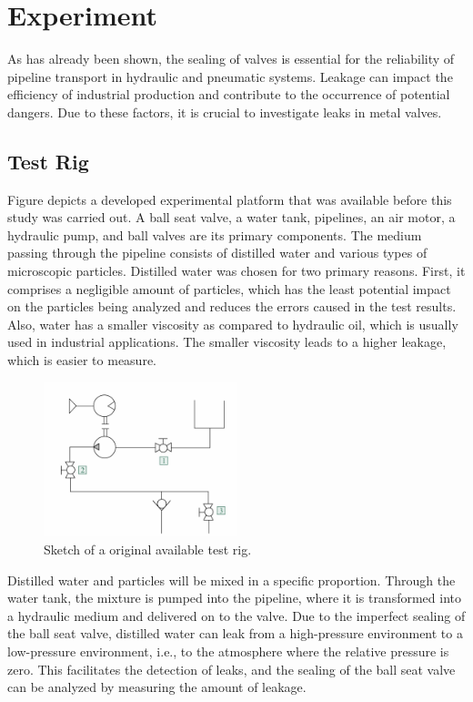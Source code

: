 \chapter{Experiment}
\label{ch:Experiment}
As has already been shown, the sealing of valves is essential for the reliability of 
pipeline transport in hydraulic and pneumatic systems. Leakage can impact the efficiency
 of industrial production and contribute to the occurrence of potential dangers. 
Due to these factors, it is crucial to investigate leaks in metal valves.\\

\section{Test Rig}
\label{Test Rig}
Figure  depicts a developed experimental platform that was available before this study 
was carried out. A ball seat valve, a water tank, pipelines, an air motor, a hydraulic pump,
and ball valves are its primary components. The medium passing through the pipeline 
consists of distilled water and various types of microscopic particles. Distilled water
was chosen for two primary reasons. First, it comprises a negligible amount of particles,
which has the least potential impact on the particles being analyzed and reduces the 
errors caused in the test results. Also, water has a smaller viscosity as compared to
hydraulic oil, which is usually used in industrial applications. 
The smaller viscosity leads to a higher leakage, which is easier to measure. \cite{fischer2021influence}\\

\begin{figure}[htbp]
    \centering
    \includegraphics[width=0.5\textwidth]{figures/TestRig/TestRig1.jpg}
    \caption{Sketch of a original available test rig.}
    \label{fig:TestRig1}
\end{figure}

Distilled water and particles will be mixed in a specific proportion. 
Through the water tank, the mixture is pumped into the pipeline, where 
it is transformed into a hydraulic medium and delivered on to the valve. 
Due to the imperfect sealing of the ball seat valve, distilled water can leak 
from a high-pressure environment to a low-pressure environment, i.e., to the 
atmosphere where the relative pressure is zero. This facilitates the detection of leaks, 
and the sealing of the ball seat valve can be analyzed by measuring the amount of leakage.\\

